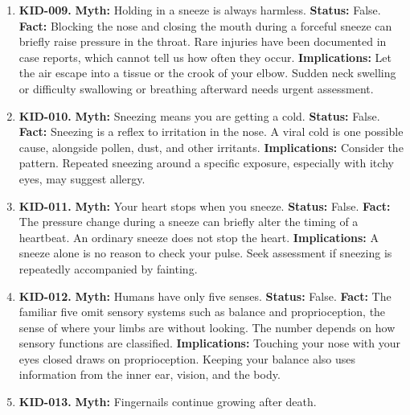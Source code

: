 \documentclass[11pt,oneside]{book}
\begin{document}
\begin{enumerate}[leftmargin=0pt,labelwidth=0pt,labelsep=0pt,itemindent=0pt]
\item[] \textbf{KID-009.} \textbf{Myth:} Holding in a sneeze is always harmless.\newline
\textbf{Status:} False.\newline
\textbf{Fact:} Blocking the nose and closing the mouth during a forceful sneeze can briefly raise pressure in the throat. Rare injuries have been documented in case reports, which cannot tell us how often they occur. \cite{ref345}\newline
\textbf{Implications:} Let the air escape into a tissue or the crook of your elbow. Sudden neck swelling or difficulty swallowing or breathing afterward needs urgent assessment.
\item[] \textbf{KID-010.} \textbf{Myth:} Sneezing means you are getting a cold.\newline
\textbf{Status:} False.\newline
\textbf{Fact:} Sneezing is a reflex to irritation in the nose. A viral cold is one possible cause, alongside pollen, dust, and other irritants. \cite{ref199}\newline
\textbf{Implications:} Consider the pattern. Repeated sneezing around a specific exposure, especially with itchy eyes, may suggest allergy.
\item[] \textbf{KID-011.} \textbf{Myth:} Your heart stops when you sneeze.\newline
\textbf{Status:} False.\newline
\textbf{Fact:} The pressure change during a sneeze can briefly alter the timing of a heartbeat. An ordinary sneeze does not stop the heart. \cite{ref346}\newline
\textbf{Implications:} A sneeze alone is no reason to check your pulse. Seek assessment if sneezing is repeatedly accompanied by fainting.
\item[] \textbf{KID-012.} \textbf{Myth:} Humans have only five senses.\newline
\textbf{Status:} False.\newline
\textbf{Fact:} The familiar five omit sensory systems such as balance and proprioception, the sense of where your limbs are without looking. The number depends on how sensory functions are classified. \cite{ref207}\newline
\textbf{Implications:} Touching your nose with your eyes closed draws on proprioception. Keeping your balance also uses information from the inner ear, vision, and the body.
\item[] \textbf{KID-013.} \textbf{Myth:} Fingernails continue growing after death.\newline

\end{enumerate}
\end{document}
